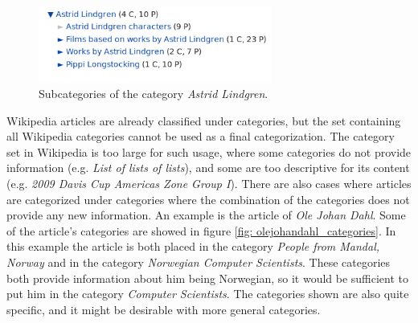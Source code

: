
\begin{figure}[H]
\centering
\includegraphics[height=2.5cm]{Chapters/Background/Astrid_Lindgren}
\caption{Subcategories of the category \emph{Astrid Lindgren}. }
\label{fig: subcat_lindgren}
\end{figure}

Wikipedia articles are already classified under categories, but the set containing all Wikipedia categories cannot be used as a final categorization. The category set in Wikipedia is too large for such usage, where some categories do not provide information (e.g. \emph{List of lists of lists}), and some are too descriptive for its content (e.g. \emph{2009 Davis Cup Americas Zone Group I}). There are also cases where articles are categorized under categories where the combination of the categories does not provide any new information. An example is the article of \emph{Ole Johan Dahl}. Some of the article's categories are showed in figure \ref{fig: olejohandahl_categories}. In this example the article is both placed in the category \emph{People from Mandal, Norway} and in the category \emph{Norwegian Computer Scientists}. These categories both provide information about him being Norwegian, so it would be sufficient to put him in the category \emph{Computer Scientists}. The categories shown are also quite specific, and it might be desirable with more general categories. 






